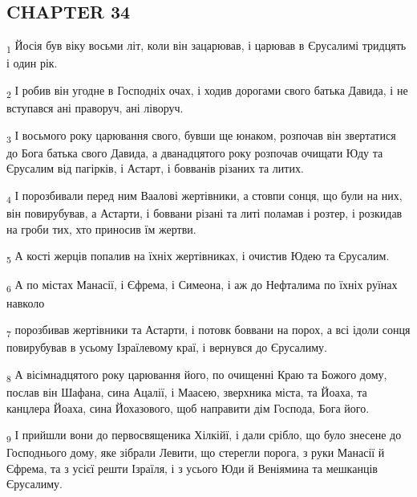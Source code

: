 \subsection{CHAPTER 34}
\begin{tcolorbox}
\textsubscript{1} Йосія був віку восьми літ, коли він зацарював, і царював в Єрусалимі тридцять і один рік.
\end{tcolorbox}
\begin{tcolorbox}
\textsubscript{2} І робив він угодне в Господніх очах, і ходив дорогами свого батька Давида, і не вступався ані праворуч, ані ліворуч.
\end{tcolorbox}
\begin{tcolorbox}
\textsubscript{3} І восьмого року царювання свого, бувши ще юнаком, розпочав він звертатися до Бога батька свого Давида, а дванадцятого року розпочав очищати Юду та Єрусалим від пагірків, і Астарт, і бовванів різаних та литих.
\end{tcolorbox}
\begin{tcolorbox}
\textsubscript{4} І порозбивали перед ним Ваалові жертівники, а стовпи сонця, що були на них, він повирубував, а Астарти, і боввани різані та литі поламав і розтер, і розкидав на гроби тих, хто приносив їм жертви.
\end{tcolorbox}
\begin{tcolorbox}
\textsubscript{5} А кості жерців попалив на їхніх жертівниках, і очистив Юдею та Єрусалим.
\end{tcolorbox}
\begin{tcolorbox}
\textsubscript{6} А по містах Манасії, і Єфрема, і Симеона, і аж до Нефталима по їхніх руїнах навколо
\end{tcolorbox}
\begin{tcolorbox}
\textsubscript{7} порозбивав жертівники та Астарти, і потовк боввани на порох, а всі ідоли сонця повирубував в усьому Ізраїлевому краї, і вернувся до Єрусалиму.
\end{tcolorbox}
\begin{tcolorbox}
\textsubscript{8} А вісімнадцятого року царювання його, по очищенні Краю та Божого дому, послав він Шафана, сина Ацалії, і Маасею, зверхника міста, та Йоаха, та канцлера Йоаха, сина Йохазового, щоб направити дім Господа, Бога його.
\end{tcolorbox}
\begin{tcolorbox}
\textsubscript{9} І прийшли вони до первосвященика Хілкійї, і дали срібло, що було знесене до Господнього дому, яке зібрали Левити, що стерегли порога, з руки Манасії й Єфрема, та з усієї решти Ізраїля, і з усього Юди й Веніямина та мешканців Єрусалиму.
\end{tcolorbox}
